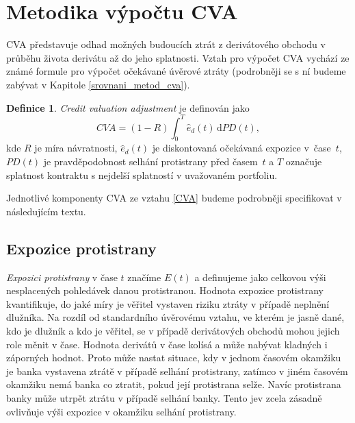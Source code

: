\documentclass[a4paper,12pt]{report}
\theoremstyle{definition} \newtheorem{definice}[veta]{Definice}
\theoremstyle{remark}
\begin{document}
\section{Metodika výpočtu CVA} \label{metodyCVA}
CVA představuje odhad možných budoucích ztrát z derivátového obchodu v průběhu života derivátu až do jeho splatnosti.
Vztah pro výpočet CVA vychází ze známé formule pro výpočet očekávané úvěrové ztráty (podrobněji se s ní budeme zabývat v Kapitole \ref{srovnani_metod_cva}).
\begin{definice}\label{cva_def}
 \textit{Credit valuation adjustment} je definován jako
 \begin{equation} \label{CVA}
 CV\!A=(1-R)\int_{0}^T \hat{e}_d(t)\,\mathrm{d} PD(t),
\end{equation}
 kde $R$ je míra návratnosti, $\hat{e}_d(t)$ je diskontovaná očekávaná expozice v~čase~$t$, $PD(t)$ je pravděpodobnost selhání protistrany před časem~$t$
a $T$ označuje splatnost kontraktu s nejdelší splatností v uvažovaném portfoliu. 
\end{definice}
Jednotlivé komponenty CVA ze vztahu \eqref{CVA} budeme podrobněji specifikovat v následujícím textu.

\subsection{Expozice protistrany}\label{exposure_kap}
\textit{Expozici protistrany} v čase $t$ značíme $E(t)$ a definujeme jako celkovou výši nesplacených pohledávek danou protistranou.
Hodnota expozice protistrany kvantifikuje, do jaké míry je věřitel vystaven riziku ztráty v případě neplnění dlužníka.
Na rozdíl od standardního úvěrovému vztahu, ve kterém je jasně dané, kdo je dlužník a kdo je věřitel, se v případě derivátových obchodů mohou jejich role měnit v čase.
Hodnota derivátů v čase kolísá a může nabývat kladných i záporných hodnot.
Proto může nastat situace, kdy v jednom časovém okamžiku je banka vystavena ztrátě v případě selhání protistrany, zatímco v jiném časovém okamžiku nemá banka co ztratit, pokud její protistrana selže.
Navíc protistrana banky může utrpět ztrátu v případě selhání banky.
Tento jev zcela zásadně ovlivňuje výši expozice v okamžiku selhání protistrany.
\end{document}
